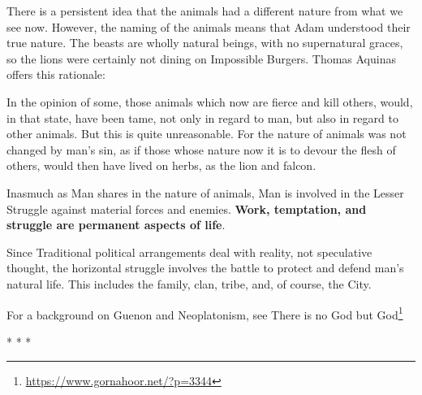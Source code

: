There is a persistent idea that the animals had a different nature from what we see now. However, the naming of the animals means that Adam understood their true nature. The beasts are wholly natural beings, with no supernatural graces, so the lions were certainly not dining on Impossible Burgers. Thomas Aquinas offers this rationale:

\begin{quotex}
In the opinion of some, those animals which now are fierce and kill others, would, in that state, have been tame, not only in regard to man, but also in regard to other animals. But this is quite unreasonable. For the nature of animals was not changed by man's sin, as if those whose nature now it is to devour the flesh of others, would then have lived on herbs, as the lion and falcon.
\end{quotex}


Inasmuch as Man shares in the nature of animals, Man is involved in the Lesser Struggle against material forces and enemies. \textbf{Work, temptation, and struggle are permanent aspects of life}.

Since Traditional political arrangements deal with reality, not speculative thought, the horizontal struggle involves the battle to protect and defend man's natural life. This includes the family, clan, tribe, and, of course, the City.

For a background on Guenon and Neoplatonism, see There is no God but God\footnote{\url{https://www.gornahoor.net/?p=3344}}



\begin{center}* * *\end{center}

